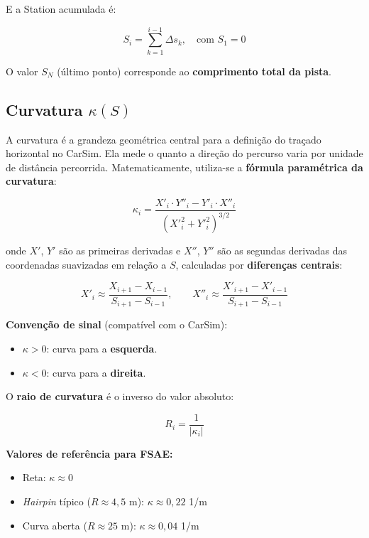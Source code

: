 \documentclass[a4paper,12pt]{article}
\begin{document}
E a Station acumulada é:

\begin{equation}
    S_i = \sum_{k=1}^{i-1} \Delta s_k, \quad \text{com } S_1 = 0
    \label{eq:S}
\end{equation}

O valor $S_N$ (último ponto) corresponde ao \textbf{comprimento total da pista}.

\subsection{Curvatura $\kappa(S)$}

A curvatura é a grandeza geométrica central para a definição do traçado horizontal no CarSim. Ela mede o quanto a direção do percurso varia por unidade de distância percorrida. Matematicamente, utiliza-se a \textbf{fórmula paramétrica da curvatura}:

\begin{equation}
    \kappa_i = \frac{X'_i \cdot Y''_i - Y'_i \cdot X''_i}{\left(X'^2_i + Y'^2_i\right)^{3/2}}
    \label{eq:curvatura}
\end{equation}

\noindent onde $X'$, $Y'$ são as primeiras derivadas e $X''$, $Y''$ são as segundas derivadas das coordenadas suavizadas em relação a $S$, calculadas por \textbf{diferenças centrais}:

\begin{equation}
    X'_i \approx \frac{X_{i+1} - X_{i-1}}{S_{i+1} - S_{i-1}}, \qquad
    X''_i \approx \frac{X'_{i+1} - X'_{i-1}}{S_{i+1} - S_{i-1}}
    \label{eq:derivadas}
\end{equation}

\textbf{Convenção de sinal} (compatível com o CarSim):
\begin{itemize}
    \item $\kappa > 0$: curva para a \textbf{esquerda}.
    \item $\kappa < 0$: curva para a \textbf{direita}.
\end{itemize}

O \textbf{raio de curvatura} é o inverso do valor absoluto:

\begin{equation}
    R_i = \frac{1}{|\kappa_i|}
    \label{eq:raio}
\end{equation}

\textbf{Valores de referência para FSAE:}
\begin{itemize}
    \item Reta: $\kappa \approx 0$
    \item \textit{Hairpin} típico ($R \approx 4{,}5$ m): $\kappa \approx 0{,}22$ 1/m
    \item Curva aberta ($R \approx 25$ m): $\kappa \approx 0{,}04$ 1/m
\end{itemize}
\end{document}
